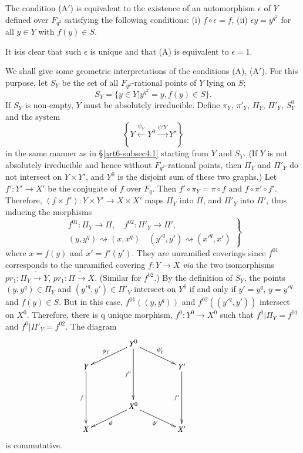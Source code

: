 \setcounter{equation}{0}
\begin{subprop}\label{art6-subprop4.2.1}
The condition (A$'$) is equivalent to the existence of an automorphism $\epsilon$ of $Y$ defined over $F_{q^2}$ satisfying the following conditions: (i) $f \circ \epsilon = f$, (ii) $\epsilon y = y^{q^2}$ for all $y \in Y$ with $f(y) \in S$.
\end{subprop}

It is\pageoriginale is clear that such $\epsilon$ is unique and that (A) is equivalent to $\epsilon =1$.

We shall give some geometric interpretations of the conditions (A), (A$'$). For this purpose, let $S_Y$ be the set of all $F_{q^2}$-rational points of $Y$ lying on $S$;
$$
S_Y = \{y \in Y | y^{q^2} = y, f (y) \in S\}.
$$
If $S_Y$ is non-empty, $Y$ must be absolutely irreducible. Define $\pi_Y$, $\pi'_Y$, $\Pi_Y$, $\Pi'_Y$, $S^0_Y$ and the system
\begin{equation}
\left\{Y \xleftarrow{\psi_Y} Y^0 \xrightarrow{\psi' Y} Y' \right\}
\label{art6-eq4.2.2}
\end{equation}
in the same manner as in \S \ref{art6-subsec4.1} starting from $Y$ and $S_Y$. (If $Y$ is not absolutely irreducible and hence without $F_{q^2}$-rational points, then $\Pi_Y$ and $\Pi'_Y$ do not intersect on $Y \times Y'$, and $Y^0$ is the disjoint sum of these two graphs.) Let $f' : Y' \longrightarrow X'$ be the conjugate of $f$ over $F_q$. Then $f' \circ \pi_Y = \pi \circ f$ and $f \circ \pi' \circ f'$. Therefore, $(f \times f') : Y \times Y' \to  X \times X'$ maps $\Pi_Y$ into $\Pi$, and $\Pi'_Y$ into $\Pi'$, thus inducing the morphisms
\begin{equation}
\left.
\begin{array}{c}
f^{01} : \Pi_Y \to \Pi, \quad f^{02} : \Pi'_Y \to \Pi',\\
(y, y^q) \rightsquigarrow (x, x^q) \quad (y'^q, y') \rightsquigarrow (x'^q, x')
\end{array}
\right\}
\label{art6-eq4.2.3}
\end{equation}
where $x = f(y)$ and $x' = f'(y')$. They are unramified coverings since $f^{01}$ corresponds to the unramified covering $f: Y \to X$ \textit{via} the two isomorphisms $pr_1 : \Pi_Y \tilde{\longrightarrow} Y$, $pr_1 : \Pi \tilde{\longrightarrow} X$. (Similar for $f^{02}$.) By the definition of $S_Y$, the points $(y, y^q) \in \Pi_Y$ and $(y'^q, y') \in \Pi'_Y$ intersect on $Y^0$ if and only if $y' = y^q$, $y = y'^q$ and $f(y) \in S$. But in this case, $f^{01} ((y, y^q))$ and $f^{02} ((y'^q, y'))$ intersect on $X^0$. Therefore, there is q unique morphism, $f^0: Y^0 \to X^0$ such that $f^0 | \Pi_Y = f^{01}$ and $f^0| \Pi'_Y = f^{02}$. The diagram
\begin{equation}
\vcenter{
\xymatrix@R=0.5cm@C=1.5cm{
& Y^0 \ar[dr]^-{\psi'_Y} \ar[dl]_-{\psi_Y} \ar[ddd]_-{f^0} & \\
Y \ar[ddd]_-f && Y' \ar[ddd]_-{f'}\\
& & &\\
& X^0 \ar[dr]_-{\psi'}  \ar[dl]^-{\psi} & \\
X & & X'}
}\label{art6-eq4.2.4}
\end{equation}
is commutative.

